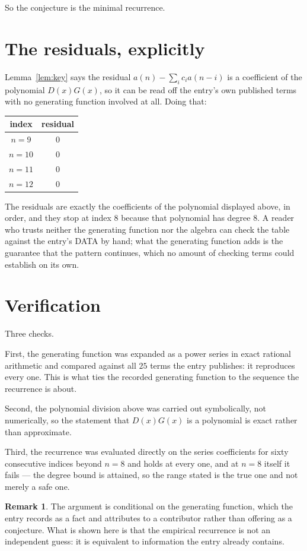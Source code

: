 \documentclass[11pt,a4paper]{article}
\theoremstyle{plain}
\theoremstyle{definition}
\newtheorem{remark}[theorem]{Remark}
\begin{document}
So the conjecture is the minimal recurrence.

\section{The residuals, explicitly}

Lemma~\ref{lem:key} says the residual $a(n)-\sum_ic_ia(n-i)$ is a coefficient of the
polynomial $D(x)G(x)$, so it can be read off the entry's own published terms with no
generating function involved at all. Doing that:
\begin{center}
\begin{tabular}{cc}
index & residual \\ \hline
$n=9$ & $0$ \\
$n=10$ & $0$ \\
$n=11$ & $0$ \\
$n=12$ & $0$
\end{tabular}
\end{center}
The residuals are exactly the coefficients of the polynomial displayed above, in order, and
they stop at index $8$ because that polynomial has degree $8$. A reader who trusts
neither the generating function nor the algebra can check the table against the entry's DATA
by hand; what the generating function adds is the guarantee that the pattern continues, which
no amount of checking terms could establish on its own.

\section{Verification}

Three checks.

First, the generating function was expanded as a power series in exact rational arithmetic and
compared against all $25$ terms the entry publishes: it reproduces every one. This is
what ties the recorded generating function to the sequence the recurrence is about.

Second, the polynomial division above was carried out symbolically, not numerically, so the
statement that $D(x)G(x)$ is a polynomial is exact rather than approximate.

Third, the recurrence was evaluated directly on the series coefficients for sixty consecutive
indices beyond $n=8$ and holds at every one, and at $n=8$ itself it fails --- the
degree bound is attained, so the range stated is the true one and not merely a safe one.

\begin{remark}
The argument is conditional on the generating function, which the entry records as a fact and
attributes to a contributor rather than offering as a conjecture. What is shown here is that
the empirical recurrence is not an independent guess: it is equivalent to information the
entry already contains.
\end{remark}
\end{document}

